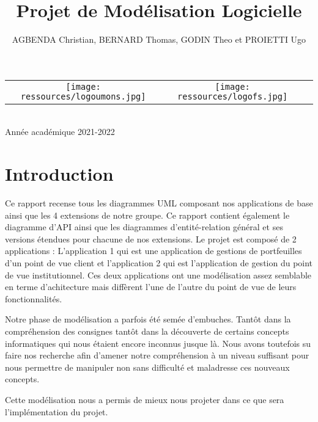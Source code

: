 \documentclass{article}
\begin{document}
\begin{titlepage}
\begin{center}
        \begin{center}
            \begin{tabular}[t]{c c c}
                \texttt{[image: ressources/logoumons.jpg]} &
                \texttt{[image: ressources/logofs.jpg]} &
            \end{tabular}
        \end{center}~\\
        
        {\large Année académique 2021-2022}
        
    \end{center}
\end{titlepage}

\title{Projet de Modélisation Logicielle}
\author{AGBENDA Christian, BERNARD Thomas, GODIN Theo et PROIETTI Ugo}
\maketitle
\tableofcontents
\newpage


\section{Introduction}
		Ce rapport recense tous les diagrammes UML composant nos applications de base ainsi que les 4 extensions de notre groupe. Ce rapport contient également le 
		diagramme d'API ainsi que les diagrammes d'entité-relation général et ses versions étendues pour chacune de nos extensions.  
		Le projet est composé de 2 applications : L'application 1 qui est une application de gestions de portfeuilles d'un point de vue client et l'application 2 qui 
		est l'application de gestion du point de vue institutionnel. Ces deux applications ont une modélisation assez semblable en terme d'achitecture mais diffèrent
		l'une de l'autre du point de vue de leurs fonctionnalités.
		\bigskip

		Notre phase de modélisation a parfois été semée d'embuches. Tantôt dans la compréhension des consignes tantôt dans la découverte de certains concepts informatiques
		qui nous étaient encore inconnus jusque là. Nous avons toutefois su faire nos recherche afin d'amener notre compréhension à un niveau suffisant pour nous permettre
		de manipuler non sans difficulté et maladresse ces nouveaux concepts.

		\bigskip

		Cette modélisation nous a permis de mieux nous projeter dans ce que sera l'implémentation du projet.
\end{document}
